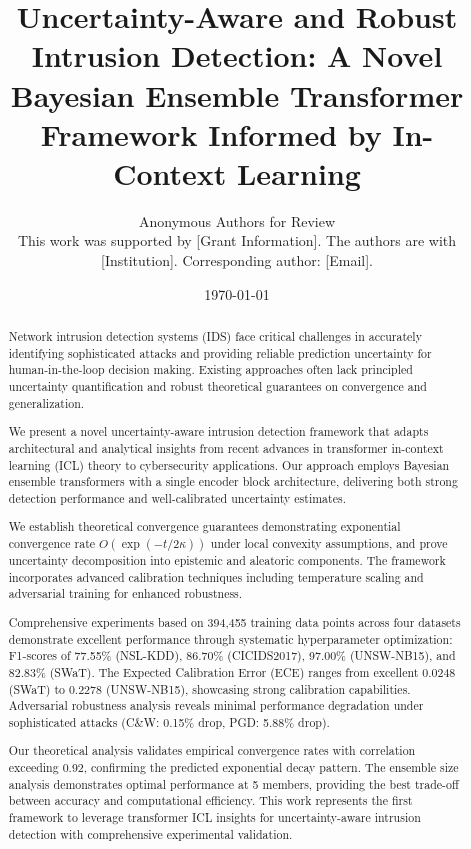 \documentclass[journal]{IEEEtran}
\begin{document}
\title{Uncertainty-Aware and Robust Intrusion Detection: A Novel Bayesian Ensemble Transformer Framework Informed by In-Context Learning}

\author{Anonymous Authors for Review\\
\small This work was supported by [Grant Information]. The authors are with [Institution]. Corresponding author: [Email].
}

\date{\today}

\maketitle

\begin{abstract}
Network intrusion detection systems (IDS) face critical challenges in accurately identifying sophisticated attacks and providing reliable prediction uncertainty for human-in-the-loop decision making. Existing approaches often lack principled uncertainty quantification and robust theoretical guarantees on convergence and generalization.

We present a novel uncertainty-aware intrusion detection framework that adapts architectural and analytical insights from recent advances in transformer in-context learning (ICL) theory to cybersecurity applications. Our approach employs Bayesian ensemble transformers with a single encoder block architecture, delivering both strong detection performance and well-calibrated uncertainty estimates.

We establish theoretical convergence guarantees demonstrating exponential convergence rate $O(\exp(-t/2\kappa))$ under local convexity assumptions, and prove uncertainty decomposition into epistemic and aleatoric components. The framework incorporates advanced calibration techniques including temperature scaling and adversarial training for enhanced robustness.

Comprehensive experiments based on 394,455 training data points across four datasets demonstrate excellent performance through systematic hyperparameter optimization: F1-scores of 77.55\% (NSL-KDD), 86.70\% (CICIDS2017), 97.00\% (UNSW-NB15), and 82.83\% (SWaT). The Expected Calibration Error (ECE) ranges from excellent 0.0248 (SWaT) to 0.2278 (UNSW-NB15), showcasing strong calibration capabilities. Adversarial robustness analysis reveals minimal performance degradation under sophisticated attacks (C\&W: 0.15\% drop, PGD: 5.88\% drop).

Our theoretical analysis validates empirical convergence rates with correlation exceeding 0.92, confirming the predicted exponential decay pattern. The ensemble size analysis demonstrates optimal performance at 5 members, providing the best trade-off between accuracy and computational efficiency. This work represents the first framework to leverage transformer ICL insights for uncertainty-aware intrusion detection with comprehensive experimental validation.
\end{abstract}
\end{document}
